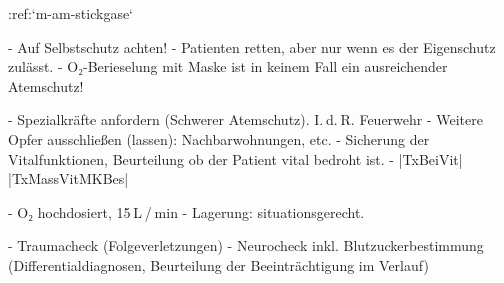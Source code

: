 :ref:`m-am-stickgase`
\begin{enumerate}
  -   Auf Selbstschutz achten!
  -   Patienten retten, aber nur wenn es der
  Eigenschutz zulässt.
  -   O₂-Berieselung mit Maske ist in keinem Fall
  ein ausreichender Atemschutz!
  
  -   Spezialkräfte anfordern (Schwerer Atemschutz).
  I. d. R. Feuerwehr
  -   Weitere Opfer ausschließen (lassen):
  Nachbarwohnungen, etc.
  -   Sicherung der Vitalfunktionen, Beurteilung ob der
  Patient vital bedroht ist.
  -   |TxBeiVit| |TxMassVitMKBes|
  \begin{itemize}
    -   O₂ hochdosiert, 15 L / min
    -   Lagerung: situationsgerecht.
  \end{itemize}
  -   Traumacheck (Folgeverletzungen)
  -   Neurocheck inkl. Blutzuckerbestimmung
  (Differentialdiagnosen, Beurteilung der Beeinträchtigung im Verlauf)
\end{enumerate}